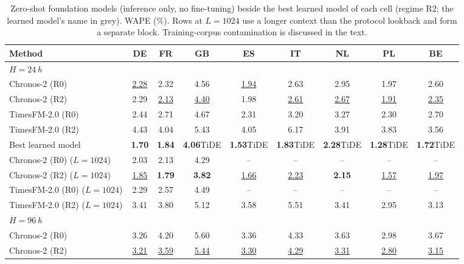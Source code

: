 \begin{table}[!t]
\centering
\caption{Zero-shot foundation models (inference only, no fine-tuning) beside the best learned model of each cell (regime R2; the learned model's name in grey). WAPE (\%). Rows at $L{=}1024$ use a longer context than the protocol lookback and form a separate block. Training-corpus contamination is discussed in the text.}
\label{tab:fm-v2}
\setlength{\tabcolsep}{3.5pt}\footnotesize
\begin{adjustbox}{max width=\linewidth}
\begin{tabular}{lcccccccc}
\toprule
Method & DE & FR & GB & ES & IT & NL & PL & BE \\
\midrule
\multicolumn{9}{l}{\textit{$H=24$\,h}} \\
Chronos-2 (R0) & \underline{2.28} & 2.32 & 4.56 & \underline{1.94} & 2.63 & 2.95 & 1.97 & 2.60 \\
Chronos-2 (R2) & 2.29 & \underline{2.13} & \underline{4.40} & 1.98 & \underline{2.61} & \underline{2.67} & \underline{1.91} & \underline{2.35} \\
TimesFM-2.0 (R0) & 2.44 & 2.71 & 4.67 & 2.31 & 3.20 & 3.27 & 2.30 & 2.70 \\
TimesFM-2.0 (R2) & 4.43 & 4.04 & 5.43 & 4.05 & 6.17 & 3.91 & 3.83 & 3.56 \\
Best learned model & \textbf{1.70}{\scriptsize\color{gray}{PLANET}} & \textbf{1.84}{\scriptsize\color{gray}{PLANET}} & \textbf{4.06}{\scriptsize\color{gray}TiDE} & \textbf{1.53}{\scriptsize\color{gray}TiDE} & \textbf{1.83}{\scriptsize\color{gray}TiDE} & \textbf{2.28}{\scriptsize\color{gray}TiDE} & \textbf{1.28}{\scriptsize\color{gray}TiDE} & \textbf{1.72}{\scriptsize\color{gray}TiDE} \\
\cmidrule(lr){1-9}
Chronos-2 (R0) ($L{=}1024$) & 2.03 & 2.13 & 4.29 & -- & -- & -- & -- & -- \\
Chronos-2 (R2) ($L{=}1024$) & \underline{1.85} & \textbf{1.79} & \textbf{3.82} & \underline{1.66} & \underline{2.23} & \textbf{2.15} & \underline{1.57} & \underline{1.97} \\
TimesFM-2.0 (R0) ($L{=}1024$) & 2.29 & 2.57 & 4.49 & -- & -- & -- & -- & -- \\
TimesFM-2.0 (R2) ($L{=}1024$) & 3.41 & 3.80 & 5.12 & 3.58 & 5.51 & 3.41 & 2.95 & 3.13 \\
\midrule
\multicolumn{9}{l}{\textit{$H=96$\,h}} \\
Chronos-2 (R0) & 3.26 & 4.20 & 5.60 & 3.36 & 4.33 & 3.63 & 2.98 & 3.67 \\
Chronos-2 (R2) & \underline{3.21} & \underline{3.59} & \underline{5.44} & \underline{3.30} & \underline{4.29} & \underline{3.31} & \underline{2.80} & \underline{3.15} \\

\end{tabular}
\end{adjustbox}
\end{table}
